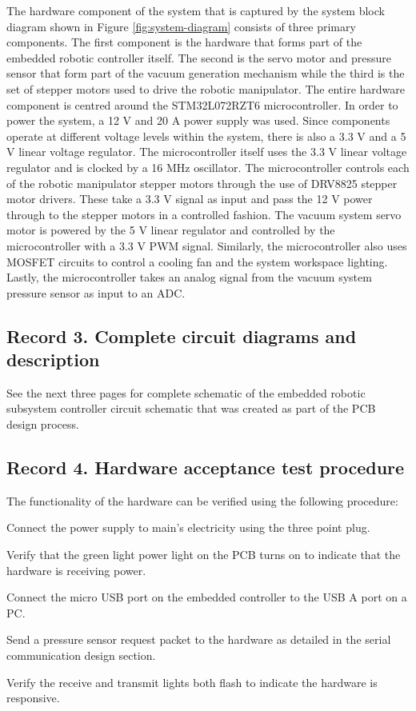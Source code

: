 The hardware component of the system that is captured by the system block diagram shown in Figure \ref{fig:system-diagram} consists of three primary components. The first component is the hardware that forms part of the embedded robotic controller itself. The second is the servo motor and pressure sensor that form part of the vacuum generation mechanism while the third is the set of stepper motors used to drive the robotic manipulator. The entire hardware component is centred around the STM32L072RZT6 microcontroller. In order to power the system, a 12 V  and 20 A power supply was used. Since components operate at different voltage levels within the system, there is also a 3.3 V and a 5 V linear voltage regulator. The microcontroller itself uses the 3.3 V linear voltage regulator and is clocked by a 16 MHz oscillator. The microcontroller controls each of the robotic manipulator stepper motors through the use of DRV8825 stepper motor drivers. These take a 3.3 V signal as input and pass the 12 V power through to the stepper motors in a controlled fashion. The vacuum system servo motor is powered by the 5 V linear regulator and controlled by the microcontroller with a 3.3 V PWM signal. Similarly, the microcontroller also uses MOSFET circuits to control a cooling fan and the system workspace lighting. Lastly, the microcontroller takes an analog signal from the vacuum system pressure sensor as input to an ADC.

\newpage

\subsection{Record 3. Complete circuit diagrams and description}

See the next three pages for complete schematic of the embedded robotic subsystem controller circuit schematic that was created as part of the PCB design process.



\subsection{Record 4. Hardware acceptance test procedure}

The functionality of the hardware can be verified using the following procedure:

\begin{compactenum}
	\item Connect the power supply to main's electricity using the three point plug.
	\item Verify that the green light power light on the PCB turns on to indicate that the hardware is receiving power.
	\item Connect the micro USB port on the embedded controller to the USB A port on a PC.
	\item Send a pressure sensor request packet to the hardware as detailed in the serial communication design section.
	\item Verify the receive and transmit lights both flash to indicate the hardware is responsive.
\end{compactenum}


